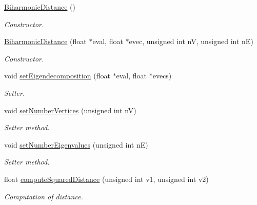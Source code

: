 \begin{DoxyCompactItemize}
\item 
\hyperlink{classHeatDiffusion_1_1Distance_1_1BiharmonicDistance_ad61fe93902113412d0cb712eb4f9bbe0}{Biharmonic\-Distance} ()
\begin{DoxyCompactList}\small\item\em Constructor. \end{DoxyCompactList}\item 
\hyperlink{classHeatDiffusion_1_1Distance_1_1BiharmonicDistance_a1cc354ae2226a700b137206c267b95b8}{Biharmonic\-Distance} (float $\ast$eval, float $\ast$evec, unsigned int n\-V, unsigned int n\-E)
\begin{DoxyCompactList}\small\item\em Constructor. \end{DoxyCompactList}\item 
void \hyperlink{classHeatDiffusion_1_1Distance_1_1BiharmonicDistance_a228d1705467139ffd387265e8ebade30}{set\-Eigendecomposition} (float $\ast$eval, float $\ast$evecs)
\begin{DoxyCompactList}\small\item\em Setter. \end{DoxyCompactList}\item 
void \hyperlink{classHeatDiffusion_1_1Distance_1_1BiharmonicDistance_a528ffb84264f0b3863c13b1bf9c2c75f}{set\-Number\-Vertices} (unsigned int n\-V)
\begin{DoxyCompactList}\small\item\em Setter method. \end{DoxyCompactList}\item 
void \hyperlink{classHeatDiffusion_1_1Distance_1_1BiharmonicDistance_adc893b08d6c0252913938a775a35bb26}{set\-Number\-Eigenvalues} (unsigned int n\-E)
\begin{DoxyCompactList}\small\item\em Setter method. \end{DoxyCompactList}\item 
float \hyperlink{classHeatDiffusion_1_1Distance_1_1BiharmonicDistance_a3c6d819ac6549c545f0476e6f669e3a1}{compute\-Squared\-Distance} (unsigned int v1, unsigned int v2)
\begin{DoxyCompactList}\small\item\em Computation of distance. \end{DoxyCompactList}\end{DoxyCompactItemize}
